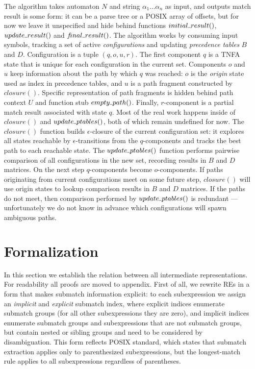 \documentclass[AMA,STIX1COL]{WileyNJD-v2}
\newcommand{\Xund}{\rule{.4em}{.4pt}}
\begin{document}
The algorithm takes automaton $N$ and string $\alpha_1 \!\hdots\! \alpha_n$ as input,
and outputs match result is some form: it can be a parse tree or a POSIX array of offsets,
but for now we leave it unspecified and hide behind functions
$initial \Xund result ()$, $update \Xund result ()$ and $f\!inal \Xund result ()$.
The algorithm works by consuming input symbols,
tracking a set of active \emph{configurations}
and updating \emph{precedence tables} $B$ and $D$.
Configuration is a tuple $(q, o, u, r)$.
The first component $q$ is a TNFA state that is unique for each configuration in the current set.
Components $o$ and $u$ keep information about the path by which $q$ was reached:
$o$ is the \emph{origin} state used as index in precedence tables,
and $u$ is a path fragment constructed by $closure()$.
Specific representation of path fragments is hidden behind path context $U$ and function stub $empty \Xund path ()$.
Finally, $r$-component is a partial match result associated with state $q$.
Most of the real work happens inside of $closure()$ and $update \Xund ptables ()$, both of which remain undefined for now.
The $closure()$ function builds $\epsilon$-closure of the current configuration set:
it explores all states reachable by $\epsilon$-transitions from the $q$-components
and tracks the best path to each reachable state.
The $update \Xund ptables ()$ function
performs pairwise comparison of all configurations in the new set,
recording results in $B$ and $D$ matrices.
On the next step $q$-components become $o$-components.
If paths originating from current configurations meet on some future step,
$closure ()$ will use origin states to lookup comparison results in $B$ and $D$ matrices.
If the paths do not meet, then comparison performed by $update \Xund ptables ()$ is redundant ---
unfortunately we do not know in advance which configurations will spawn ambiguous paths.
\\


\section{Formalization}\label{section_formalization}

In this section we establish the relation between all intermediate representations.
For readability all proofs are moved to appendix.
%
First of all, we rewrite REs in a form that makes submatch information explicit:
to each subexpression we assign an \emph{implicit} and \emph{explicit} submatch index, where
explicit indices enumerate submatch groups (for all other subexpressions they are zero),
and implicit indices enumerate submatch groups and subexpressions that are not submatch groups,
but contain nested or sibling groups and need to be considered by disambiguation.
This form reflects POSIX standard, which states that
submatch extraction applies only to parenthesized subexpressions,
but the longest-match rule applies to all subexpressions regardless of parentheses.
\end{document}
